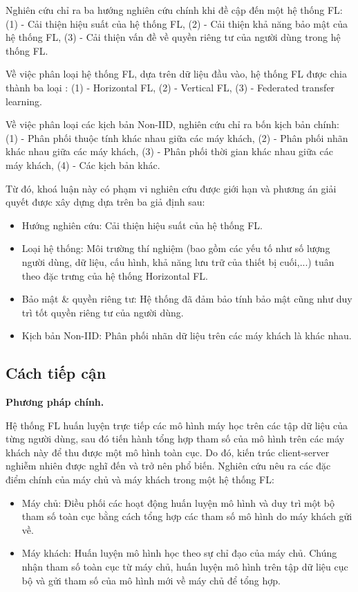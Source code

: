 Nghiên cứu \cite{yin2021comprehensive} chỉ ra ba hướng nghiên cứu chính khi đề cập đến một hệ thống FL: (1) - Cải thiện hiệu suất của hệ thống FL, (2) - Cải thiện khả năng bảo mật của hệ thống FL, (3) - Cải thiện vấn đề về quyền riêng tư của người dùng trong hệ thống FL.

Về việc phân loại hệ thống FL, dựa trên dữ liệu đầu vào, hệ thống FL được chia thành ba loại \cite{yin2021comprehensive}: (1) - Horizontal FL, (2) - Vertical FL, (3) - Federated transfer learning.

Về việc phân loại các kịch bản Non-IID, nghiên cứu \cite{zhu2021federated} chỉ ra bốn kịch bản chính: (1) - Phân phối thuộc tính khác nhau giữa các máy khách, (2) - Phân phối nhãn khác nhau giữa các máy khách, (3) - Phân phối thời gian khác nhau giữa các máy khách, (4) - Các kịch bản khác.

Từ đó, khoá luận này có phạm vi nghiên cứu được giới hạn và phương án giải quyết được xây dựng dựa trên ba giả định sau:

\begin{itemize}
    \item Hướng nghiên cứu: Cải thiện hiệu suất của hệ thống FL.
    \item Loại hệ thống: Môi trường thí nghiệm (bao gồm các yếu tố như số lượng người dùng, dữ liệu, cấu hình, khả năng lưu trữ của thiết bị cuối,...) tuân theo đặc trưng của hệ thống Horizontal FL.
    \item Bảo mật \& quyền riêng tư: Hệ thống đã đảm bảo tính bảo mật cũng như duy trì tốt quyền riêng tư của người dùng.
    \item Kịch bản Non-IID: Phân phối nhãn dữ liệu trên các máy khách là khác nhau.
\end{itemize}

\subsection*{Cách tiếp cận}

\textbf{Phương pháp chính.}

Hệ thống FL huấn luyện trực tiếp các mô hình máy học trên các tập dữ liệu của từng người dùng, sau đó tiến hành tổng hợp tham số của mô hình trên các máy khách này để thu được một mô hình toàn cục. Do đó, kiến trúc client-server nghiễm nhiên được nghĩ đến và trở nên phổ biến. Nghiên cứu \cite{yin2021comprehensive} nêu ra các đặc điểm chính của máy chủ và máy khách trong một hệ thống FL:

\begin{itemize}
    \item Máy chủ: Điều phối các hoạt động huấn luyện mô hình và duy trì một bộ tham số toàn cục bằng cách tổng hợp các tham số mô hình do máy khách gửi về.
    \item Máy khách: Huấn luyện mô hình học theo sự chỉ đạo của máy chủ. Chúng nhận tham số toàn cục từ máy chủ, huấn luyện mô hình trên tập dữ liệu cục bộ và gửi tham số của mô hình mới về máy chủ để tổng hợp.
\end{itemize}

